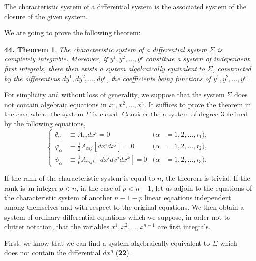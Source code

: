 \begin{dfn*}
  The characteristic system of a differential system is the associated system of the closure of the given system.
\end{dfn*}

We are going to prove the following theorem:

\vspace{12pt}\addtocounter{frenchsec}{1}
\newtheorem*{thm44}{\hspace{15pt}\textbf{44.} Theorem}

\begin{thm44}
  The characteristic system of a differential system $\Sigma$ is completely integrable. Moreover, if $y^{1},y^{2},\dots,y^{p}$ constitute a system of independent first integrals, there then exists a system algebraically equivalent to $\Sigma$, constructed by the differentials $dy^{1},dy^{2},\dots,dy^{p}$, the coefficients being functions of $y^{1},y^{2},\dots,y^{p}$.
\end{thm44}

For simplicity and without loss of generality, we suppose that the system $\Sigma$ does not contain algebraic equations in $x^{1},x^{2},\dots,x^{n}$. It suffices to prove the theorem in the case where the system $\Sigma$ is closed.  Consider the a system of degree $3$ defined by the following equations,
\begin{equation}
  \label{eq:3.7}
  \left\{
    \begin{aligned}
      \theta_{\alpha}&\equiv A_{\alpha i}dx^{i}=0&(\alpha&=1,2,\dots,r_{1}),\\
      \varphi_{\alpha}&\equiv \frac{1}{2}A_{\alpha ij}[dx^{i}dx^{j}]=0&(\alpha&=1,2,\dots,r_{2}),\\
      \psi_{\alpha}&\equiv \frac{1}{6}A_{\alpha ijk}[dx^{i}dx^{j}dx^{k}]=0&(\alpha&=1,2,\dots,r_{3}).
    \end{aligned}
  \right.
\end{equation}

If the rank of the characteristic system is equal to $n$, the theorem is trivial. If the rank is an integer $p<n$, in the case of $p<n-1$, let us adjoin to the equations of the characteristic system of another $n-1-p$ linear equations independent among themselves and with respect to the original equations. We then obtain a system of ordinary differential equations which we suppose, in order not to clutter notation, that the variables $x^{1},x^{2},\dots,x^{n-1}$ are first integrals.

First, we know that we can find a system algebraically equivalent to $\Sigma$ which does not contain the differential $dx^{n}$ (\textsection\textbf{22}).

